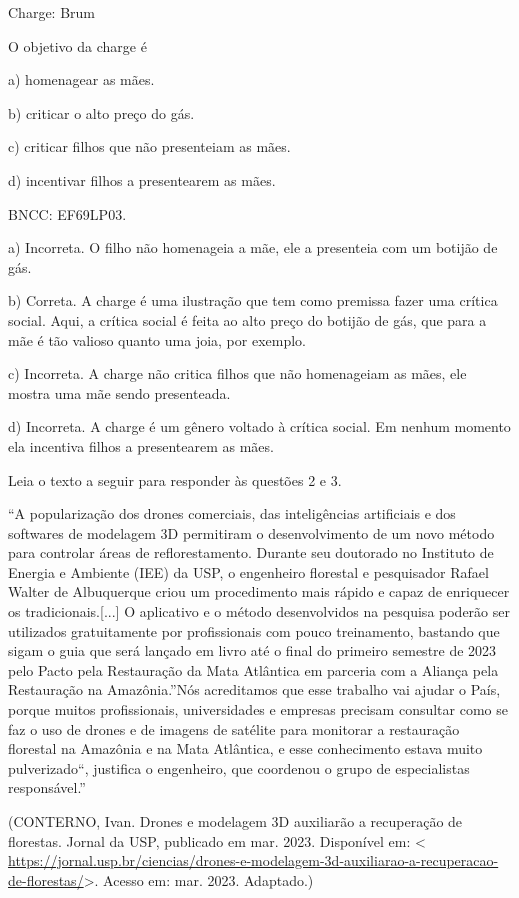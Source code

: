 {Charge: Brum

O objetivo da charge é

a) homenagear as mães.

b) criticar o alto preço do gás.

c) criticar filhos que não presenteiam as mães.

d) incentivar filhos a presentearem as mães.

BNCC: EF69LP03.

a) Incorreta. O filho não homenageia a mãe, ele a presenteia com um
botijão de gás.

b) Correta. A charge é uma ilustração que tem como premissa fazer uma
crítica social. Aqui, a crítica social é feita ao alto preço do botijão
de gás, que para a mãe é tão valioso quanto uma joia, por exemplo.

c) Incorreta. A charge não critica filhos que não homenageiam as mães,
ele mostra uma mãe sendo presenteada.

d) Incorreta. A charge é um gênero voltado à crítica social. Em nenhum
momento ela incentiva filhos a presentearem as mães.

Leia o texto a seguir para responder às questões 2 e 3.

``A popularização dos drones comerciais, das inteligências artificiais e
dos softwares de modelagem 3D permitiram o desenvolvimento de um novo
método para controlar áreas de reflorestamento. Durante seu doutorado no
Instituto de Energia e Ambiente (IEE) da USP, o engenheiro florestal e
pesquisador Rafael Walter de Albuquerque criou um procedimento mais
rápido e capaz de enriquecer os tradicionais.{[}...{]} O aplicativo e o
método desenvolvidos na pesquisa poderão ser utilizados gratuitamente
por profissionais com pouco treinamento, bastando que sigam o guia que
será lançado em livro até o final do primeiro semestre de 2023 pelo
Pacto pela Restauração da Mata Atlântica em parceria com a Aliança pela
Restauração na Amazônia.''Nós acreditamos que esse trabalho vai ajudar o
País, porque muitos profissionais, universidades e empresas precisam
consultar como se faz o uso de drones e de imagens de satélite para
monitorar a restauração florestal na Amazônia e na Mata Atlântica, e
esse conhecimento estava muito pulverizado``, justifica o engenheiro,
que coordenou o grupo de especialistas responsável.''

(CONTERNO, Ivan. Drones e modelagem 3D auxiliarão a recuperação de
florestas. Jornal da USP, publicado em mar. 2023. Disponível em:
\textless{}
\url{https://jornal.usp.br/ciencias/drones-e-modelagem-3d-auxiliarao-a-recuperacao-de-florestas/}\textgreater.
Acesso em: mar. 2023. Adaptado.)

}
